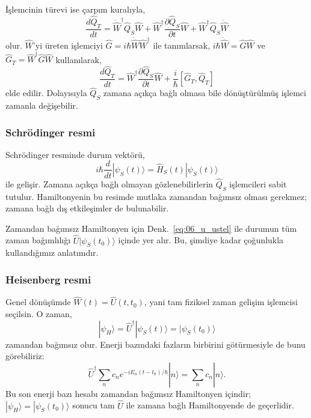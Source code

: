 \documentclass[00_kitap.tex]{subfiles}
\begin{document}
İşlemcinin türevi ise çarpım kuralıyla,
\begin{equation}
 \frac{d\hat Q_T}{dt}
 =\dot{\hat W}^{\dagger}\hat Q_S\hat W
  +\hat W^\dagger\frac{\partial\hat Q_S}{\partial t}\hat W
  +\hat W^\dagger\hat Q_S\dot{\hat W}
\end{equation}
olur. $\hat W$'yi üreten işlemciyi
$\hat G=i\hbar\dot{\hat W}\hat W^\dagger$ ile tanımlarsak,
$i\hbar\dot{\hat W}=\hat G\hat W$ ve
$\hat G_T=\hat W^\dagger\hat G\hat W$ kullanılarak,
\begin{equation}
 \boxed{\frac{d\hat Q_T}{dt}
 =\hat W^\dagger\frac{\partial\hat Q_S}{\partial t}\hat W
   +\frac{i}{\hbar}[\hat G_T,\hat Q_T]}
 \label{eq:06_islemci_donusum_turevi}
\end{equation}
elde edilir. Dolayısıyla $\hat Q_S$ zamana açıkça bağlı olmasa
bile dönüştürülmüş işlemci zamanla değişebilir.

\subsubsection{Schrödinger resmi}

Schrödinger resminde durum vektörü,
\begin{equation}
 i\hbar\frac{d}{dt}|\psi_S(t)\rangle
 =\hat H_S(t)|\psi_S(t)\rangle
\end{equation}
ile gelişir. Zamana açıkça bağlı olmayan gözlenebilirlerin
$\hat Q_S$ işlemcileri sabit tutulur. Hamiltonyenin bu resimde
mutlaka zamandan bağımsız olması gerekmez; zamana bağlı dış
etkileşimler de bulunabilir.

Zamandan bağımsız Hamiltonyen için
Denk.~\eqref{eq:06_u_ustel} ile durumun tüm zaman bağımlılığı
$\hat U|\psi_S(t_0)\rangle$ içinde yer alır. Bu, şimdiye kadar
çoğunlukla kullandığımız anlatımdır.

\subsubsection{Heisenberg resmi}

Genel dönüşümde $\hat W(t)=\hat U(t,t_0)$, yani tam fiziksel zaman
gelişim işlemcisi seçilsin. O zaman,
\begin{equation}
 |\psi_H\rangle=\hat U^\dagger|\psi_S(t)\rangle
 =|\psi_S(t_0)\rangle
 \label{eq:06_heisenberg_durum}
\end{equation}
zamandan bağımsız olur. Enerji bazındaki fazların birbirini
götürmesiyle de bunu görebiliriz:
\begin{equation}
 \hat U^\dagger\sum_n c_ne^{-iE_n(t-t_0)/\hbar}|n\rangle
 =\sum_n c_n|n\rangle.
\end{equation}
Bu son enerji bazı hesabı zamandan bağımsız Hamiltonyen içindir;
$|\psi_H\rangle=|\psi_S(t_0)\rangle$ sonucu tam $\hat U$ ile
zamana bağlı Hamiltonyende de geçerlidir.
\end{document}
